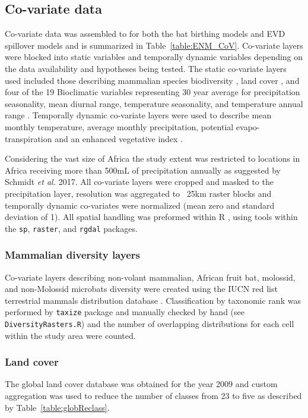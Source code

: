 \documentclass[9pt,twoside,lineno]{pnas-new}
\begin{document}
\subsection*{Co-variate data}
\label{CoV}
Co-variate data was assembled to for both the bat birthing models and EVD spillover models and is summarized in Table~\ref{table:ENM_CoV}. Co-variate layers were blocked into static variables and temporally dynamic variables depending on the data availability and hypotheses being tested. The static co-variate layers used included those describing mammalian species biodiversity \cite{IUCN2016TerrestrialData}, land cover \cite{Olivier2012Global2009}, and four of the 19 Bioclimatic variables representing 30 year average for precipitation seasonality, mean diurnal range, temperature seasonality, and temperature annual range \cite{Frick2017WorldclimArease}. Temporally dynamic co-variate layers were used to describe mean monthly temperature, average monthly precipitation, potential evapo-transpiration \cite{Trabucco2009GlobalDatabase} and an enhanced vegetative index \cite{Huete2002OverviewIndices}.\par
Considering the vast size of Africa the study extent was restricted to locations in Africa receiving more than 500mL of precipitation annually as suggested by Schmidt \textit{et al.} 2017\cite{Schmidt2017SpatiotemporalSpillover}. All co-variate layers were cropped and  masked to the precipitation layer, resolution was aggregated to ~25km raster blocks and temporally dynamic co-variates were normalized (mean zero and standard deviation of 1). All spatial handling was preformed within R \cite{Team2017R:Computing}, using tools within the \texttt{sp}, \texttt{raster}, and \texttt{rgdal} packages.\par
\subsubsection*{Mammalian diversity layers}
Co-variate layers describing non-volant mammalian, African fruit bat, molossid, and non-Molossid microbats diversity were created using the IUCN red list terrestrial mammals distribution database \cite{IUCN2016TerrestrialData}. Classification by taxonomic rank was performed by \texttt{taxize} package \cite{Chamberlain2013Taxize:R} and manually checked by hand (see \texttt{DiversityRasters.R}) and the number of overlapping distributions for each cell within the study area were counted.\par
\subsubsection*{Land cover}
The global land cover database \cite{Olivier2012Global2009} was obtained for the year 2009 and custom aggregation was used to reduce the number of classes from 23 to five as described by Table~\ref{table:globReclass}.\par
\end{document}
